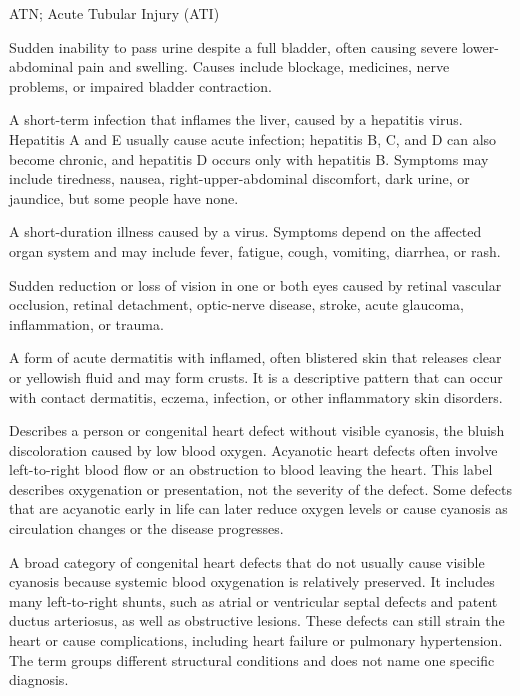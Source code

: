 \synonyms
ATN; Acute Tubular Injury (ATI)

 Sudden inability to pass urine despite a full bladder, often causing severe lower-abdominal pain and swelling. Causes include blockage, medicines, nerve problems, or impaired bladder contraction.

 A short-term infection that inflames the liver, caused by a hepatitis virus. Hepatitis A and E usually cause acute infection; hepatitis B, C, and D can also become chronic, and hepatitis D occurs only with hepatitis B. Symptoms may include tiredness, nausea, right-upper-abdominal discomfort, dark urine, or jaundice, but some people have none.

 A short-duration illness caused by a virus. Symptoms depend on the affected organ system and may
include fever, fatigue, cough, vomiting, diarrhea, or rash.

 Sudden reduction or loss of vision in one or both eyes caused by retinal vascular occlusion, retinal detachment, optic-nerve disease, stroke, acute glaucoma, inflammation, or trauma.

 A form of acute dermatitis with inflamed, often blistered skin that releases clear or yellowish fluid and may form crusts. It is a descriptive pattern that can occur with contact dermatitis, eczema, infection, or other inflammatory skin disorders.

 Describes a person or congenital heart defect without visible cyanosis, the bluish discoloration caused by low blood oxygen. Acyanotic heart defects often involve left-to-right blood flow or an obstruction to blood
leaving the heart. This label describes oxygenation or presentation, not the severity of the defect.
Some defects that are acyanotic early in life can later reduce oxygen levels or cause cyanosis as
circulation changes or the disease progresses.

 A broad category of congenital heart defects that do not usually cause visible cyanosis because systemic blood oxygenation is relatively preserved. It includes many left-to-right shunts, such as atrial or ventricular septal defects and patent ductus arteriosus, as well as obstructive
lesions. These defects can still strain the heart or cause complications, including heart failure
or pulmonary hypertension. The term groups different structural conditions and does not name
one specific diagnosis.

